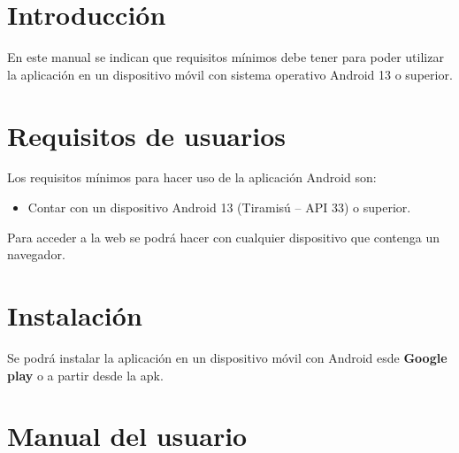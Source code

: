 
\section{Introducción}
En este manual se indican que requisitos mínimos debe tener para poder utilizar la aplicación en un dispositivo móvil con sistema operativo Android 13 o superior.

\section{Requisitos de usuarios}
Los requisitos mínimos para hacer uso de la aplicación Android son:
\begin{itemize}
	\item Contar con un dispositivo Android 13 (Tiramisú – API 33) o superior.
\end{itemize}

Para acceder a la web se podrá hacer con cualquier dispositivo que contenga un navegador.

\section{Instalación}
Se podrá instalar la aplicación en un dispositivo móvil con Android esde \textbf{Google play} o a partir desde la apk.

\section{Manual del usuario}



